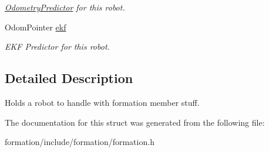 \begin{DoxyCompactItemize}
\begin{DoxyCompactList}\small\item\em \hyperlink{classOdometryPredictor}{Odometry\+Predictor} for this robot. \end{DoxyCompactList}\item 
Odom\+Pointer \hyperlink{structFormation_1_1Robot_a770933c2c9760bc47c81a8d6579de317}{ekf}\hypertarget{structFormation_1_1Robot_a770933c2c9760bc47c81a8d6579de317}{}\label{structFormation_1_1Robot_a770933c2c9760bc47c81a8d6579de317}

\begin{DoxyCompactList}\small\item\em E\+KF Predictor for this robot. \end{DoxyCompactList}\end{DoxyCompactItemize}


\subsection{Detailed Description}
Holds a robot to handle with formation member stuff. 

The documentation for this struct was generated from the following file\+:\begin{DoxyCompactItemize}
\item 
formation/include/formation/formation.\+h\end{DoxyCompactItemize}
